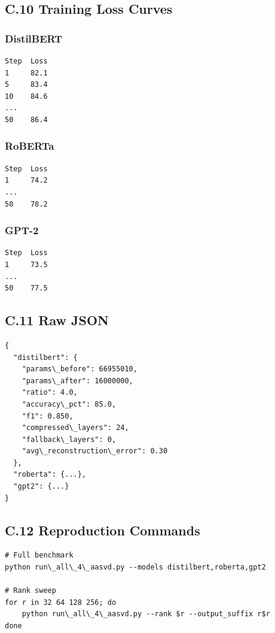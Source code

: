 \subsection{C.10 Training Loss Curves}

\subsubsection{DistilBERT}
\begin{lstlisting}
Step  Loss
1     82.1
5     83.4
10    84.6
...
50    86.4
\end{lstlisting}

\subsubsection{RoBERTa}
\begin{lstlisting}
Step  Loss
1     74.2
...
50    78.2
\end{lstlisting}

\subsubsection{GPT-2}
\begin{lstlisting}
Step  Loss
1     73.5
...
50    77.5
\end{lstlisting}

\subsection{C.11 Raw JSON}

\begin{lstlisting}
{
  "distilbert": {
    "params\_before": 66955010,
    "params\_after": 16000000,
    "ratio": 4.0,
    "accuracy\_pct": 85.0,
    "f1": 0.850,
    "compressed\_layers": 24,
    "fallback\_layers": 0,
    "avg\_reconstruction\_error": 0.30
  },
  "roberta": {...},
  "gpt2": {...}
}
\end{lstlisting}

\subsection{C.12 Reproduction Commands}

\begin{lstlisting}
# Full benchmark
python run\_all\_4\_aasvd.py --models distilbert,roberta,gpt2

# Rank sweep
for r in 32 64 128 256; do
    python run\_all\_4\_aasvd.py --rank $r --output_suffix r$r
done
\end{lstlisting}